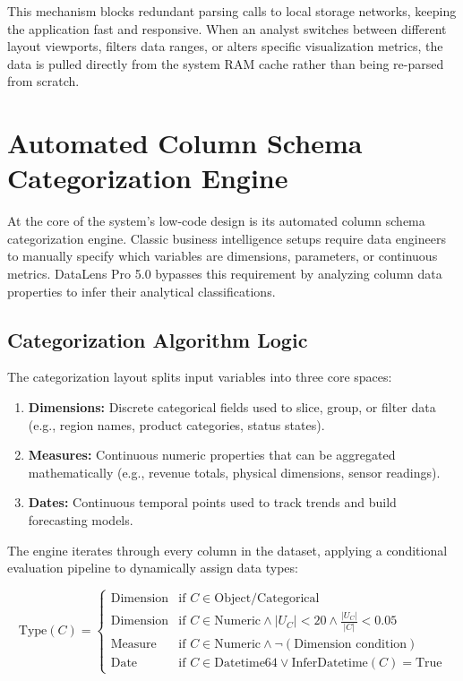 \documentclass[11pt,a4paper,titlepage]{article}
\begin{document}
This mechanism blocks redundant parsing calls to local storage networks, keeping the application fast and responsive. When an analyst switches between different layout viewports, filters data ranges, or alters specific visualization metrics, the data is pulled directly from the system RAM cache rather than being re-parsed from scratch.


\section{Automated Column Schema Categorization Engine}
At the core of the system's low-code design is its automated column schema categorization engine. Classic business intelligence setups require data engineers to manually specify which variables are dimensions, parameters, or continuous metrics. DataLens Pro 5.0 bypasses this requirement by analyzing column data properties to infer their analytical classifications.

\subsection{Categorization Algorithm Logic}
The categorization layout splits input variables into three core spaces:
\begin{enumerate}
    \item \textbf{Dimensions:} Discrete categorical fields used to slice, group, or filter data (e.g., region names, product categories, status states).
    \item \textbf{Measures:} Continuous numeric properties that can be aggregated mathematically (e.g., revenue totals, physical dimensions, sensor readings).
    \item \textbf{Dates:} Continuous temporal points used to track trends and build forecasting models.
\end{enumerate}

The engine iterates through every column in the dataset, applying a conditional evaluation pipeline to dynamically assign data types:

$$\text{Type}(C) = \begin{cases} 
\text{Dimension} & \text{if } C \in \text{Object/Categorical} \\
\text{Dimension} & \text{if } C \in \text{Numeric} \land |U_C| < 20 \land \frac{|U_C|}{|C|} < 0.05 \\
\text{Measure} & \text{if } C \in \text{Numeric} \land \neg (\text{Dimension condition}) \\
\text{Date} & \text{if } C \in \text{Datetime64} \lor \text{InferDatetime}(C) = \text{True}
\end{cases}$$
\end{document}
